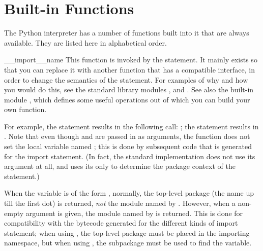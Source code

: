 \section{Built-in Functions}
\label{built-in-funcs}

The Python interpreter has a number of functions built into it that
are always available.  They are listed here in alphabetical order.



\begin{funcdesc}{__import__}{name}
This function is invoked by the  statement.  It
mainly exists so that you can replace it with another
function that has a compatible interface, in order to change the
semantics of the  statement.  For examples of why and
how you would do this, see the standard library modules ,
 and .  See also the built-in module
, which defines some useful operations out of which you can
build your own  function.

For example, the statement   results in the
following call:
  ;
the statement    results
in   
\code{['eggs'])}.
Note that even though  and \code{['eggs']} are passed
in as arguments, the  function does not set the
local variable named ; this is done by subsequent code that
is generated for the import statement.  (In fact, the standard
implementation does not use its  argument at all, and uses
its  only to determine the package context of the
 statement.)

When the  variable is of the form ,
normally, the top-level package (the name up till the first dot) is
returned, \emph{not} the module named by .  However, when a
non-empty  argument is given, the module named by
 is returned.  This is done for compatibility with the
bytecode generated for the different kinds of import statement; when
using , the top-level package 
must be placed in the importing namespace, but when using , the  subpackage must be used to
find the  variable.
\end{funcdesc}

